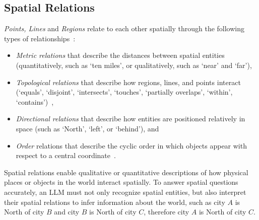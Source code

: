 \subsection{Spatial Relations}
\textit{Points, Lines} and \textit{Regions} relate to each other spatially through the following types of relationships~\cite{Carniel2020,Bertella2022,Carniel2023}: 
\begin{itemize}
    \item \textit{Metric relations} that describe the distances between spatial entities (quantitatively, such as `ten miles', or qualitatively, such as `near' and `far'),
    \item \textit{Topological relations} that describe how regions, lines, and points interact (`equals', `disjoint', `intersects', `touches', `partially overlaps', `within', `contains')~\cite{Minervino2023,Clementini1994,Strobl2008}, 
    \item \textit{Directional relations} that describe how entities are positioned relatively in space (such as `North', `left', or `behind'), and
    \item \textit{Order} relations that describe the cyclic order in which objects appear with respect to a central coordinate~\cite{Schwering2014}.
\end{itemize}


%
Spatial relations enable qualitative or quantitative descriptions of how physical places or objects in the world interact spatially.
To answer spatial questions accurately, an LLM must not only recognize spatial entities, but also interpret their spatial relations to infer information about the world, such as city $A$ is North of city $B$ and city $B$ is North of city $C$, therefore city $A$ is North of city $C$.







